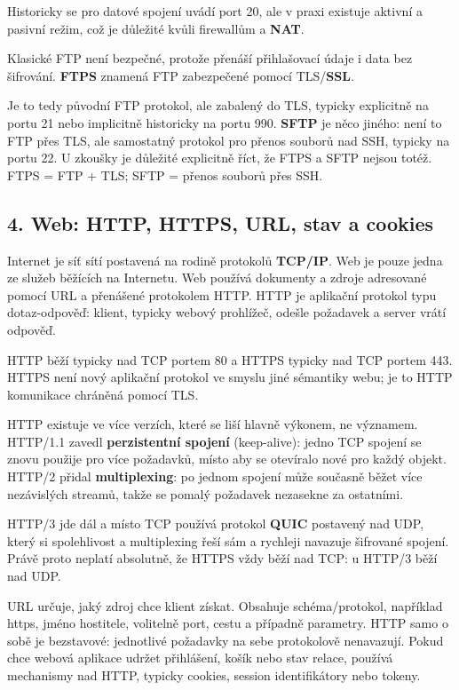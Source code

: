 Historicky se pro datové spojení uvádí port 20, ale v praxi existuje aktivní a pasivní režim, což je důležité kvůli firewallům a \textbf{NAT}.

Klasické FTP není bezpečné, protože přenáší přihlašovací údaje i data bez šifrování. \textbf{FTPS} znamená FTP zabezpečené pomocí TLS/\textbf{SSL}.

Je to tedy původní FTP protokol, ale zabalený do TLS, typicky explicitně na portu 21 nebo implicitně historicky na portu 990. \textbf{SFTP} je něco jiného: není to FTP přes TLS, ale samostatný protokol pro přenos souborů nad SSH, typicky na portu 22. U zkoušky je důležité explicitně říct, že FTPS a SFTP nejsou totéž. FTPS = FTP + TLS; SFTP = přenos souborů přes SSH.

\subsection*{4. Web: HTTP, HTTPS, URL, stav a cookies}

Internet je síť sítí postavená na rodině protokolů \textbf{TCP/IP}. Web je pouze jedna ze služeb běžících na Internetu. Web používá dokumenty a zdroje adresované pomocí URL a přenášené protokolem HTTP. HTTP je aplikační protokol typu dotaz-odpověď: klient, typicky webový prohlížeč, odešle požadavek a server vrátí odpověď.

HTTP běží typicky nad TCP portem 80 a HTTPS typicky nad TCP portem 443. HTTPS není nový aplikační protokol ve smyslu jiné sémantiky webu; je to HTTP komunikace chráněná pomocí TLS.

HTTP existuje ve více verzích, které se liší hlavně výkonem, ne významem. HTTP/1.1 zavedl \textbf{perzistentní spojení} (keep-alive): jedno TCP spojení se znovu použije pro více požadavků, místo aby se otevíralo nové pro každý objekt. HTTP/2 přidal \textbf{multiplexing}: po jednom spojení může současně běžet více nezávislých streamů, takže se pomalý požadavek nezasekne za ostatními.

HTTP/3 jde dál a místo TCP používá protokol \textbf{QUIC} postavený nad UDP, který si spolehlivost a multiplexing řeší sám a rychleji navazuje šifrované spojení. Právě proto neplatí absolutně, že HTTPS vždy běží nad TCP: u HTTP/3 běží nad UDP.

URL určuje, jaký zdroj chce klient získat. Obsahuje schéma/protokol, například https, jméno hostitele, volitelně port, cestu a případně parametry. HTTP samo o sobě je bezstavové: jednotlivé požadavky na sebe protokolově nenavazují. Pokud chce webová aplikace udržet přihlášení, košík nebo stav relace, používá mechanismy nad HTTP, typicky cookies, session identifikátory nebo tokeny.


